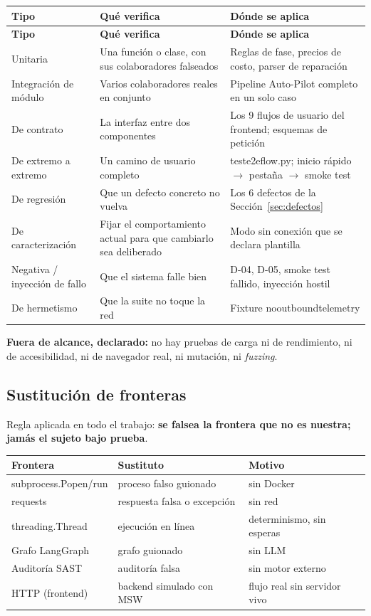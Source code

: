 \documentclass[11pt,a4paper]{article}
\newcommand{\code}[1]{{\ttfamily\small\def\_{\textunderscore\allowbreak}#1}}
\begin{document}
\begin{longtable}{p{3.4cm} p{5.3cm} p{6.6cm}}
\toprule
\textbf{Tipo} & \textbf{Qué verifica} & \textbf{Dónde se aplica} \\ \midrule
\endfirsthead
\toprule \textbf{Tipo} & \textbf{Qué verifica} & \textbf{Dónde se aplica} \\ \midrule \endhead
Unitaria & Una función o clase, con sus colaboradores falseados & Reglas de fase, precios de costo, parser de reparación \\
Integración de módulo & Varios colaboradores reales en conjunto & Pipeline Auto-Pilot completo en un solo caso \\
De contrato & La interfaz entre dos componentes & Los 9 flujos de usuario del frontend; esquemas de petición \\
De extremo a extremo & Un camino de usuario completo & \code{test\_e2e\_flow.py}; inicio rápido $\rightarrow$ pestaña $\rightarrow$ smoke test \\
De regresión & Que un defecto concreto no vuelva & Los 6 defectos de la Sección~\ref{sec:defectos} \\
De caracterización & Fijar el comportamiento actual para que cambiarlo sea deliberado & Modo sin conexión que se declara plantilla \\
Negativa / inyección de fallo & Que el sistema falle bien & D-04, D-05, smoke test fallido, inyección hostil \\
De hermetismo & Que la suite no toque la red & Fixture \code{no\_outbound\_telemetry} \\
\bottomrule
\end{longtable}

\noindent\textbf{Fuera de alcance, declarado:} no hay pruebas de carga ni de rendimiento, ni de
accesibilidad, ni de navegador real, ni mutación, ni \emph{fuzzing}.

\subsection*{Sustitución de fronteras}

Regla aplicada en todo el trabajo: \textbf{se falsea la frontera que no es nuestra; jamás el
sujeto bajo prueba}.

\begin{center}
\begin{tabular}{lll}
\toprule
\textbf{Frontera} & \textbf{Sustituto} & \textbf{Motivo} \\
\midrule
\code{subprocess.Popen/run} & proceso falso guionado & sin Docker \\
\code{requests}             & respuesta falsa o excepción & sin red \\
\code{threading.Thread}     & ejecución en línea & determinismo, sin esperas \\
Grafo LangGraph             & grafo guionado & sin LLM \\
Auditoría SAST              & auditoría falsa & sin motor externo \\
HTTP (frontend)             & backend simulado con MSW & flujo real sin servidor vivo \\
\bottomrule
\end{tabular}
\end{center}
\end{document}
